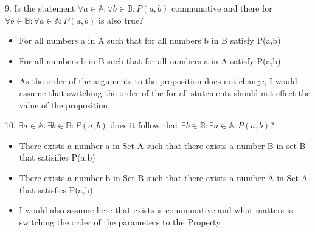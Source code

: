 \documentclass{article}
\begin{document}
  9. Is the statement $\forall a \in \mathbb{A}: \forall b \in \mathbb{B}: P(a,b)$ communative and there for $\forall b \in \mathbb{B}: \forall a \in \mathbb{A}: P(a,b)$ is also true? 
  \newline
  \begin{itemize}
    \item For all numbers a in A such that for all numbers b in B satisfy P(a,b)
    \item For all numbers b in B such that for all numbers a in A satisfy P(a,b)
    \item As the order of the arguments to the proposition does not change, I would assume that switching the order of the for all statements should not effect the value of the proposition.
  \end{itemize}
  10. $\exists a \in \mathbb{A}: \exists b \in \mathbb{B}: P(a,b)$ does it follow that $\exists b \in \mathbb{B}: \exists a \in \mathbb{A}: P(a,b)$? 
  \begin{itemize}
    \item There exists a number a in Set A such that there exists a number B in set B that satisifies P(a,b)
    \item There exists a number b in Set B such that there exists a number A in Set A that satisfies P(a,b)
    \item I would also assume here that exists is communative and what matters is switching the order of the parameters to the Property.
  \end{itemize}
\end{document}
